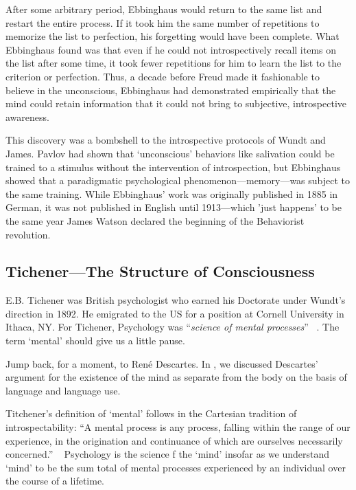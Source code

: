 \begin{refsection}
After some arbitrary period, Ebbinghaus would return to the same list and restart the entire process. If it took him the same number of repetitions to memorize the list to perfection, his forgetting would have been complete. What Ebbinghaus found was that even if he could not introspectively recall items on the list after some time, it took fewer repetitions for him to learn the list to the criterion or perfection. Thus, a decade before Freud made it fashionable to believe in the unconscious, Ebbinghaus had demonstrated empirically that the mind could retain information that it could not bring to subjective, introspective awareness.

This discovery was a bombshell to the introspective protocols of Wundt and James. Pavlov had shown that `unconscious' behaviors like salivation could be trained to a stimulus without the intervention of introspection, but Ebbinghaus showed that a paradigmatic psychological phenomenon—memory—was subject to the same training. While Ebbinghaus' work was originally published in 1885 in German, it was not published in English until 1913---which ’just happens’ to be the same year James Watson declared the beginning of the Behaviorist revolution.

\subsection{Tichener---The Structure of Consciousness}
\label{tichener---thestructureofconsciousness}

E.B. Tichener was British psychologist who earned his Doctorate under Wundt’s direction in 1892. He emigrated to the US for a position at Cornell University in Ithaca, NY. For Tichener, Psychology was “\emph{science of mental processes}” ~\citep[p. 5]{Titchener:1896tr}. The term ‘mental’ should give us a little pause. 

Jump back, for a moment, to René Descartes. In , we discussed Descartes’ argument for the existence of the mind as separate from the body on the basis of language and language use. 

Titchener’s definition of ‘mental’ follows in the Cartesian tradition of introspectability: “A mental process is any process, falling within the range of our experience, in the origination and continuance of which are ourselves necessarily concerned.” ~\citep[p. 5]{Titchener:1896tr} Psychology is the science f the ‘mind’ insofar as we understand ‘mind’ to be the sum total of mental processes experienced by an individual over the course of a lifetime. 


\end{refsection}
